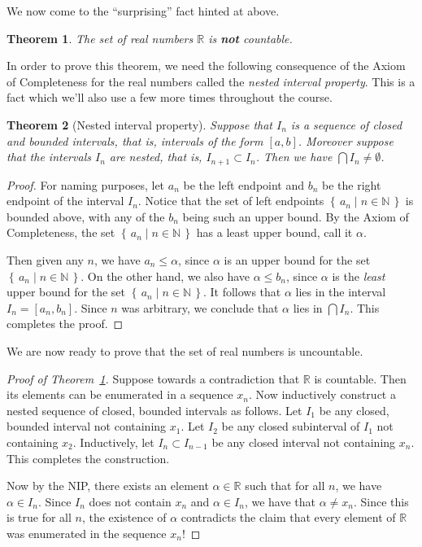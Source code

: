 \documentclass[11pt,oneside]{amsbook}
\newcommand{\set}[1]{\left\{\,#1\,\right\}}
\newcommand{\N}{\mathbb N}
\newcommand{\R}{\mathbb R}
\theoremstyle{definition}
\theoremstyle{plain}
\newtheorem{theorem}{Theorem}[section]
\theoremstyle{definition}
\theoremstyle{remark}
\numberwithin{equation}{section}
\numberwithin{figure}{section}
\begin{document}
We now come to the ``surprising'' fact hinted at above.

\begin{theorem}
  \label{thm:reals-uncountable}
  The set of real numbers $\R$ is \textbf{not} countable.
\end{theorem}

In order to prove this theorem, we need the following consequence of the Axiom of Completeness for the real numbers called the \emph{nested interval property}. This is a fact which we'll also use a few more times throughout the course.

\begin{theorem}[Nested interval property]
  Suppose that $I_n$ is a sequence of closed and bounded intervals, that is, intervals of the form $[a,b]$. Moreover suppose that the intervals $I_n$ are nested, that is, $I_{n+1}\subset I_n$. Then we have $\bigcap I_n\neq\emptyset$.
\end{theorem}

\begin{proof}
  For naming purposes, let $a_n$ be the left endpoint and $b_n$ be the right endpoint of the interval $I_n$. Notice that the set of left endpoints $\set{a_n\mid n\in\N}$ is bounded above, with any of the $b_n$ being such an upper bound. By the Axiom of Completeness, the set $\set{a_n\mid n\in\N}$ has a least upper bound, call it $\alpha$.

  Then given any $n$, we have $a_n\leq\alpha$, since $\alpha$ is an upper bound for the set $\set{a_n\mid n\in\N}$. On the other hand, we also have $\alpha\leq b_n$, since $\alpha$ is the \emph{least} upper bound for the set $\set{a_n\mid n\in\N}$. It follows that $\alpha$ lies in the interval $I_n=[a_n,b_n]$. Since $n$ was arbitrary, we conclude that $\alpha$ lies in $\bigcap I_n$. This completes the proof.
\end{proof}

We are now ready to prove that the set of real numbers is uncountable.

\begin{proof}[Proof of Theorem~\ref{thm:reals-uncountable}]
  Suppose towards a contradiction that $\R$ is countable. Then its elements can be enumerated in a sequence $x_n$. Now inductively construct a nested sequence of closed, bounded intervals as follows. Let $I_1$ be any closed, bounded interval not containing $x_1$. Let $I_2$ be any closed subinterval of $I_1$ not containing $x_2$. Inductively, let $I_n\subset I_{n-1}$ be any closed interval not containing $x_n$. This completes the construction.

  Now by the NIP, there exists an element $\alpha\in\R$ such that for all $n$, we have $\alpha\in I_n$. Since $I_n$ does not contain $x_n$ and $\alpha\in I_n$, we have that $\alpha\neq x_n$. Since this is true for all $n$, the existence of $\alpha$ contradicts the claim that every element of $\R$ was enumerated in the sequence $x_n$!
\end{proof}
\end{document}
